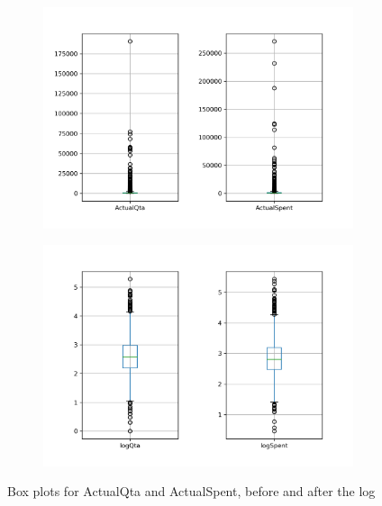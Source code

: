 \begin{figure}
\captionsetup{justification=centering}
\begin{subfigure}{0.5\textwidth}
\centering
\includegraphics[width=\textwidth]{img/boxplot_for_actuals.png}
\caption{}
\label{fig:boxplot_actuals}
\end{subfigure}
\begin{subfigure}{0.5\textwidth}
\centering
\includegraphics[width=\textwidth]{img/boxplot_for_log_actuals.png}
\caption{}
\label{fig:boxplot_logs}
\end{subfigure}
\caption{Box plots for ActualQta and ActualSpent, before and after the log}
\end{figure}
